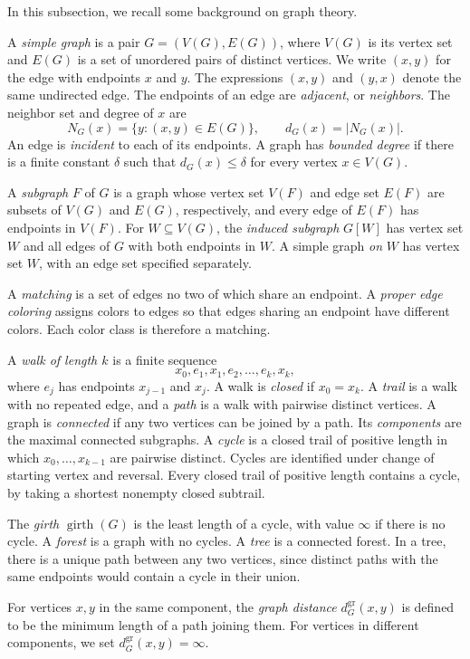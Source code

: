 \documentclass[11pt,a4paper]{article}
\theoremstyle{definition}\newtheorem{definition}[theorem]{Definition}
\theoremstyle{remark}\newtheorem{remark}[theorem]{Remark}
\DeclareMathOperator{\girth}{girth}
\begin{document}
In this subsection, we recall some background on graph theory. 

A \emph{simple graph} is a pair $G=(V(G),E(G))$, where $V(G)$ is
its vertex set and $E(G)$ is a set of unordered pairs of distinct
vertices. We write $(x,y)$ for the edge with endpoints $x$ and $y$.
The expressions $(x,y)$ and $(y,x)$ denote the same undirected edge.
The endpoints of an edge are \emph{adjacent}, or \emph{neighbors}.
The neighbor set and degree of $x$ are
$$
N_G(x)=\{y:(x,y)\in E(G)\},\qquad d_G(x)=|N_G(x)|.
$$
An edge is \emph{incident} to each of its endpoints. A graph has
\emph{bounded degree} if there is a finite constant $\delta$ such that
$d_G(x)\le \delta$ for every vertex $x\in V(G)$.

A \emph{subgraph} $F$ of $G$ is a graph whose vertex set $V(F)$ and edge set $E(F)$ are subsets of $V(G)$ and $E(G)$, respectively, and every edge of $E(F)$ has endpoints in $V(F)$. For
$W\subseteq V(G)$, the \emph{induced subgraph} $G[W]$ has vertex set
$W$ and all edges of $G$ with both endpoints in $W$. A simple graph
\emph{on} $W$ has vertex set $W$, with an edge set specified separately.


A \emph{matching} is a set of edges no two of which share an
endpoint. A \emph{proper edge coloring} assigns colors to edges so
that edges sharing an endpoint have different colors. Each color
class is therefore a matching.


A \emph{walk of length $k$} is a finite sequence
$$
x_0,e_1,x_1,e_2,\ldots,e_k,x_k,
$$
where $e_j$ has endpoints $x_{j-1}$ and $x_j$. A walk is \emph{closed}
if $x_0=x_k$. A \emph{trail} is a walk with no repeated edge, and a
\emph{path} is a walk with pairwise distinct vertices. A graph is
\emph{connected} if any two vertices can be joined by a path. Its
\emph{components} are the maximal connected subgraphs. A \emph{cycle}
is a closed trail of positive length in which $x_0,\ldots,x_{k-1}$
are pairwise distinct. Cycles are identified under change of starting
vertex and reversal. Every closed trail of positive length contains
a cycle, by taking a shortest nonempty closed subtrail.

The \emph{girth} $\girth(G)$ is the least length of a cycle, with value
$\infty$ if there is no cycle. A \emph{forest} is a graph with no cycles.
A \emph{tree} is a connected forest. In a tree, there is a unique path
between any two vertices, since distinct paths with the same endpoints
would contain a cycle in their union.


For vertices $x,y$ in the same component, the \emph{graph distance}
$d_G^{\mathrm{gr}}(x,y)$ is defined to be the minimum length of a path joining them. For vertices in different components, we set $d_G^{\mathrm{gr}}(x,y)=\infty$.
\end{document}
